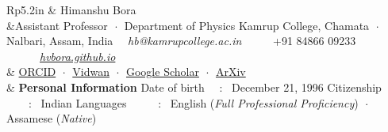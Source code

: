 \documentclass[a4paper, 11pt]{article}
\newenvironment{SectionTable}[1]{
	\renewcommand*{\arraystretch}{1.7}
	\setlength{\tabcolsep}{10pt}
	\begin{longtable}{Rp{5.2in}} & #1 \\}
{\end{longtable}\vspace{-.3cm}}
\begin{document}

\begin{SectionTable}{\Huge \color{Bittersweet} Himanshu Bora}
&{\large Assistant Professor $\;\boldsymbol{\cdot}\;$ Department of Physics} \newline
Kamrup College, Chamata $\;\boldsymbol{\cdot}\;$ Nalbari, Assam, India \newline
\faEnvelope \ \ \textit{hb@kamrupcollege.ac.in} \ \ \ \  \faPhone \ +91 84866 09233 \ \ \ \ 
\faGlobe \ \ \href{https://hvbora.github.io}{\textit{hvbora.github.io}}  \\

&
\href{https://orcid.org/0000-0001-9694-4441}{ORCID} 
$\;\boldsymbol{\cdot}\;$
\href{https://vidwan.inflibnet.ac.in/profile/593335}{Vidwan}
$\;\boldsymbol{\cdot}\;$
\href{https://scholar.google.com/citations?user=2mxLUZ0AAAAJ&hl=en}{Google Scholar}
$\;\boldsymbol{\cdot}\;$
\href{https://arxiv.org/a/0000-0001-9694-4441.html}{ArXiv} 
\\
		
&
{\textbf {Personal Information}} \newline
Date of birth \ \ : \ December 21, 1996 \newline
Citizenship \ \ \ \ : \ Indian \newline
Languages \ \ \ \ \ : \ English (\textit{Full Professional Proficiency})  $\;\boldsymbol{\cdot}\;$  Assamese (\textit{Native})\\
\end{SectionTable}
\end{document}
